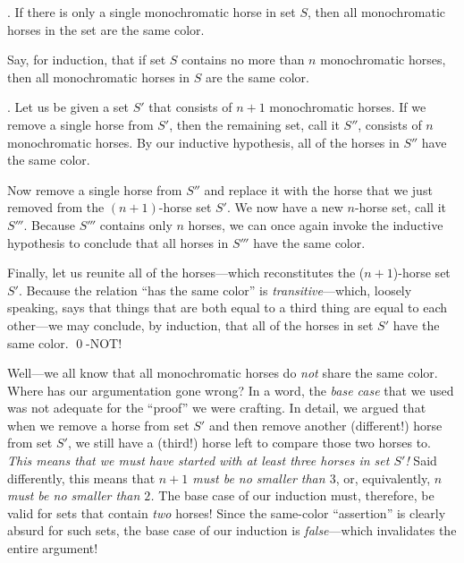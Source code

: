 .
If there is only a single monochromatic horse in set $S$, then all monochromatic horses in the set are the same color.

\smallskip

Say, for induction, that if set $S$ contains no more than $n$ monochromatic horses, then all monochromatic horses in $S$ are the same color.

\smallskip

.
Let us be given a set $S'$ that consists of $n+1$ monochromatic horses.  If we remove a single 
horse from $S'$, then the remaining set, call it $S''$, consists of $n$ monochromatic horses.  By our inductive hypothesis, all of the horses in $S''$ have the same color.

Now remove a single horse from $S''$ and replace it with the horse that we just removed from the $(n+1)$-horse set $S'$.  We now have a new $n$-horse set, call it $S'''$.  Because $S'''$ contains only $n$ horses, we can once again invoke the inductive hypothesis to conclude that all horses in $S'''$ have the same color.

\smallskip

Finally, let us reunite all of the horses---which reconstitutes the ($n+1$)-horse set $S'$.  Because the relation ``has the same color'' is {\em transitive}---which, loosely speaking, says that things that are both equal to a third thing are equal to each other---we may conclude, by induction, that all of the horses in set $S'$ have the same color.  \qed-NOT!

\medskip

Well---we all know that all monochromatic horses do {\em not} share the same color.  Where has our argumentation gone wrong?  In a word, the {\em base case} that we used was not adequate for the ``proof'' we were crafting.  In detail, we argued that when we remove a horse from set $S'$ and then remove another (different!) horse from set $S'$, we still have a (third!) horse left to compare those two horses to.  {\em This means that we must have started with at least {\em three} horses in set $S'$!}  Said differently, this means that {\em $n+1$ must be no smaller than $3$}, or, equivalently, {\em $n$ must be no smaller than $2$.}  The base case of our induction must, therefore, be valid for sets that contain {\em two} horses!  Since the same-color ``assertion'' is clearly absurd for such sets, the base case of our induction is {\em false}---which invalidates the entire argument!

